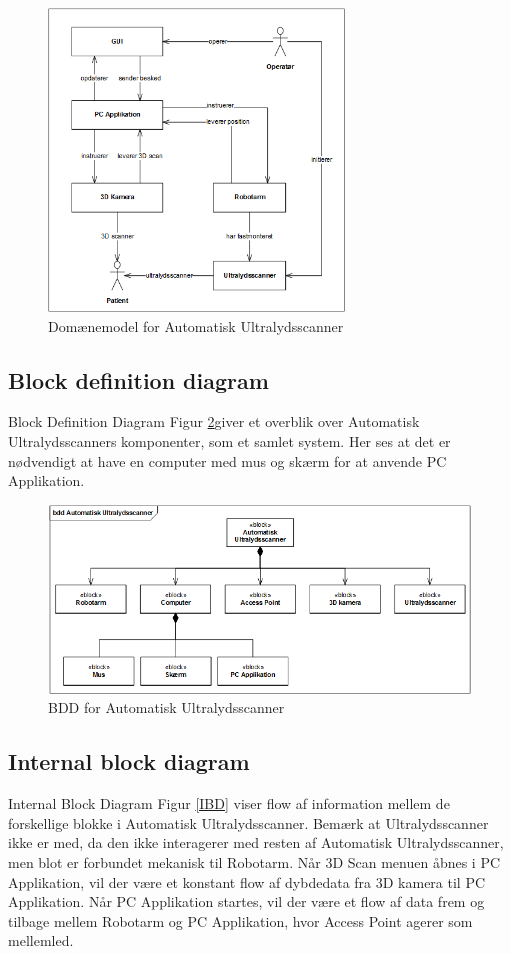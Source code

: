 \begin{figure}[H]
    \centering
    \includegraphics[width=0.7\textwidth]{figurer/d/Design/uml_domain}
    \caption{Domænemodel for Automatisk Ultralydsscanner}
    \label{domain}
\end{figure}

\subsection{Block definition diagram}
Block Definition Diagram Figur \ref{BDD}giver et overblik over Automatisk Ultralydsscanners komponenter, som et samlet system.
Her ses at det er nødvendigt at have en computer med mus og skærm for at anvende PC Applikation.

\begin{figure}[H]
    \centering
    \includegraphics[width=1\textwidth]{figurer/d/Design/BDD}
    \caption{BDD for Automatisk Ultralydsscanner}
    \label{BDD}
\end{figure}
\newpage

\subsection{Internal block diagram}
Internal Block Diagram Figur \ref{IBD} viser flow af information mellem de forskellige blokke i Automatisk Ultralydsscanner.
Bemærk at Ultralydsscanner ikke er med, da den ikke interagerer med resten af Automatisk Ultralydsscanner, men blot er forbundet mekanisk til Robotarm.
Når 3D Scan menuen åbnes i PC Applikation, vil der være et konstant flow af dybdedata fra 3D kamera til PC Applikation.
Når PC Applikation startes, vil der være et flow af data frem og tilbage mellem Robotarm og PC Applikation, hvor Access Point agerer som mellemled. 

